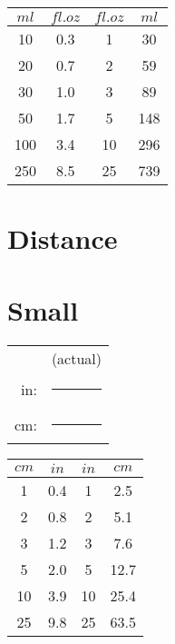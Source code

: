 \documentclass{article}
\begin{document}
\begin{multicols}{2}
\begin{multicols}{2}
\columnbreak 


\begin{tabular}{cc|cc}
	$ml$ & $fl. oz$ & $fl. oz$ & $ml$ \\ \hline
	10			&	0.3		& 1		& 30 	\\
	20			&	0.7		& 2		& 59 	\\
	30			& 	1.0		& 3		& 89 	\\
	50			&	1.7		& 5		& 148	\\
	100			&	3.4		& 10	& 296 	\\
	250			&	8.5		& 25	& 739 	\\
\end{tabular}

\end{multicols}

\columnbreak












\section*{Distance}

\vspace{1cm}

\section*{\large Small}

\begin{multicols}{2}


\begin{sideways}
\begin{tabular}{rl}
&(actual)\\
in: &	\rule{1in}{1ex} \\
cm: &	\rule{1cm}{1ex} \\
\end{tabular}
\end{sideways}

\columnbreak

\begin{tabular}{cc|cc}
	$cm$ & $in$ & $in$ & $cm$ \\ \hline
	1			&	0.4		& 1		& 2.5 	\\
	2			&	0.8		& 2		& 5.1 	\\
	3			& 	1.2		& 3		& 7.6 	\\
	5			&	2.0		& 5		& 12.7 	\\
	10			&	3.9		& 10	& 25.4 	\\
	25			&	9.8		& 25	& 63.5 	\\
\end{tabular}






\end{multicols}
\end{multicols}
\end{document}
